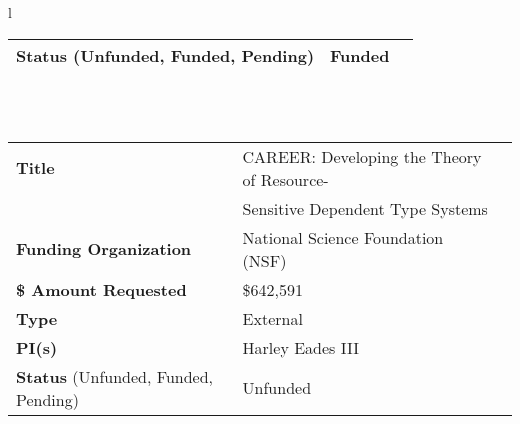 \documentclass[11pt]{article}
\begin{document}
\begin{tabular}{l}
\begin{tabular}{|l|l|l|}
          \hline
          \textbf{Status} (Unfunded, Funded, Pending) & Funded\\
          \hline
        \end{tabular}\\
        \\
        \begin{tabular}{|l|l|l|}
          \hline
          \textbf{Title} & CAREER: Developing the Theory of Resource-\\
                         & Sensitive Dependent Type Systems \\
          \hline
          \textbf{Funding Organization} & National Science Foundation (NSF)\\
          \hline
          \textbf{\$ Amount Requested} & \$642,591\\
          \hline
          \textbf{Type} & External\\
          \hline
          \textbf{PI(s)} & Harley Eades III\\
          \hline
          \textbf{Status} (Unfunded, Funded, Pending) & Unfunded\\
          \hline
        \end{tabular}\\
        \\        
    \end{tabular}
    \\
\end{document}
